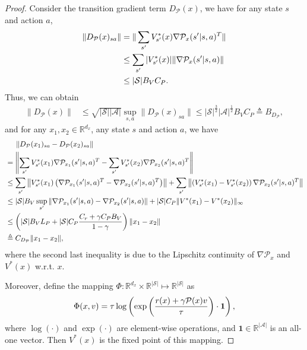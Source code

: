 \documentclass{article}
\theoremstyle{plain}
\theoremstyle{definition}
\theoremstyle{remark}
\def\R{\mathbb R}
\def\cA{\mathcal A}
\def\cP{\mathcal P}
\def\cS{\mathcal S}
\def\bydef{\triangleq}
\begin{document}
\begin{proof}
    Consider the transition gradient term $D_\cP(x)$, we have for any state $s$ and action $a$,
    \begin{align}
         \| D_\cP(x)_{sa}\|  & = \|\sum_{s^\prime} V^*_{s^\prime}(x) \nabla \cP_x(s^\prime|s,a)^T \|\notag \\
         & \leq \sum_{s^\prime} |V^*_{s^\prime}(x)| \| \nabla \cP_x(s^\prime|s,a) \| \notag \\
         &  \leq |\cS| B_V C_P. \notag
    \end{align}
    Thus, we can obtain
    \begin{align}
        \| D_\cP(x) \| & \leq \sqrt{|\cS||\cA|} \sup_{s,a} \| D_\cP(x)_{sa} \| \leq |\cS|^{\frac{3}{2}} |\cA|^{\frac{1}{2}} B_V C_P \bydef B_{D_\cP} ,
    \end{align}
    and for any $x_1,x_2 \in \R^{d_x}$, any state $s$ and action $a$, we have
    \begin{align}
        & \quad \; \left\|D_\cP(x_1)_{sa} - D_\cP(x_2)_{sa}\right\| \notag \\
        & = \left\|\sum_{s^\prime} V^*_{s^\prime}(x_1) \nabla \cP_{x_1}(s^\prime|s,a)^T - \sum_{s^\prime} V^*_{s^\prime}(x_2) \nabla \cP_{x_2}(s^\prime|s,a)^T \right\| \notag\\
        & \leq \sum_{s^\prime} \left\|V_{s^\prime}^*(x_1) \left( \nabla \cP_{x_1}(s^\prime|s,a)^T - \nabla \cP_{x_2}(s^\prime|s,a)^T \right) \right\| + \sum_{s^\prime} \left\| \left( V^*_{s^\prime}(x_1) - V^*_{s^\prime}(x_2) \right) \nabla \cP_{x_2}(s^\prime|s,a)^T \right\| \notag \\
        & \leq |\cS| B_V \sup_{s^\prime} \| \nabla \cP_{x_1}(s^\prime|s,a) - \nabla \cP_{x_2}(s^\prime|s,a) \| + |\cS| C_P \| V^*(x_1) - V^*(x_2) \|_\infty \notag \\
        & \leq \left( |\cS| B_V L_P  + |\cS| C_P \frac{C_r + \gamma C_P B_V}{1-\gamma} \right) \|x_1 - x_2\| \notag \\
        & \bydef C_{D_\cP} \|x_1 - x_2\|,
    \end{align}
    where the second last inequality is due to the Lipschitz continuity of $\nabla \cP_x$ and $V^*(x)$ w.r.t. $x$.

    Moreover, define the mapping $\Phi: \R^{d_x} \times \R^{|\cS|} \mapsto \R^{|\cS|}$ as 
    \begin{align}
        \Phi(x,v) = \tau \log \left( \exp\left( \frac{r(x) + \gamma \cP(x) v}{\tau}\right) \cdot \mathbf{1} \right), \notag
    \end{align}
    where $\log(\cdot)$ and $\exp(\cdot)$ are element-wise operations, and $\mathbf{1}\in\R^{|\cA|}$ is an all-one vector. Then $V^*(x)$ is the fixed point of this mapping.
    

\end{proof}
\end{document}
